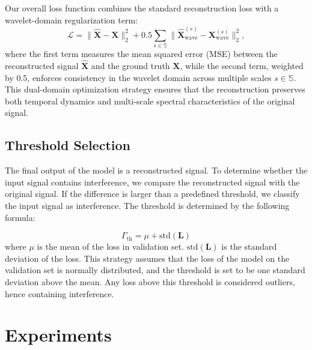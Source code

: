 \documentclass[conference]{IEEEtran}
\begin{document}
Our overall loss function combines the standard reconstruction loss with a wavelet-domain regularization term:
\begin{equation}
    \mathcal{L} = \|\mathbf{\hat{X}} - \mathbf{X}\|_2^2 + 0.5\sum_{s\in\mathbb{S}} \|\mathbf{\hat{X}}_{\text{wave}}^{(s)} - \mathbf{X}_{\text{wave}}^{(s)}\|_2^2,
\end{equation}
where the first term measures the mean squared error (MSE) between the reconstructed signal $\mathbf{\hat{X}}$ and the ground truth $\mathbf{X}$, while the second term, weighted by 0.5, enforces consistency in the wavelet domain across multiple scales $s \in \mathbb{S}$. This dual-domain optimization strategy ensures that the reconstruction preserves both temporal dynamics and multi-scale spectral characteristics of the original signal.


\subsection{Threshold Selection}

The final output of the model is a reconstructed signal. To determine whether the input signal contains interference, we compare the reconstructed signal with the original signal. If the difference is larger than a predefined threshold, we classify the input signal as interference. The threshold is determined by the following formula:

\begin{equation}
    \Gamma_{\text{th}} = \mu + \text{std}(\mathbf{L})
\end{equation}
where $\mu$ is the mean of the loss in validation set.  $\text{std}(\mathbf{L})$ is the standard deviation of the loss. This strategy assumes that the loss of the model on the validation set is normally distributed, and the threshold is set to be one standard deviation above the mean. Any loss above this threshold is considered outliers, hence containing interference.



\section{Experiments}
\label{sec:experiments}


\end{document}
